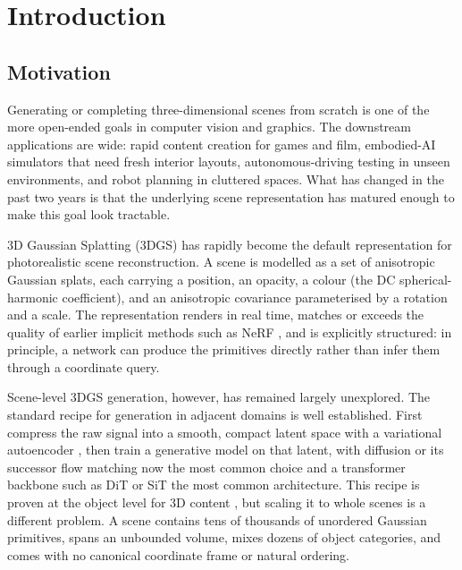 \chapter{Introduction}
\label{chap:intro}

\section{Motivation}
\label{sec:intro_motivation}

Generating or completing three-dimensional scenes from scratch is one of the more open-ended goals in computer vision and graphics. The downstream applications are wide: rapid content creation for games and film, embodied-AI simulators that need fresh interior layouts, autonomous-driving testing in unseen environments, and robot planning in cluttered spaces. What has changed in the past two years is that the underlying scene representation has matured enough to make this goal look tractable.

3D Gaussian Splatting (3DGS) \citep{kerbl2023gaussian} has rapidly become the default representation for photorealistic scene reconstruction. A scene is modelled as a set of anisotropic Gaussian splats, each carrying a position, an opacity, a colour (the DC spherical-harmonic coefficient), and an anisotropic covariance parameterised by a rotation and a scale. The representation renders in real time, matches or exceeds the quality of earlier implicit methods such as NeRF \citep{mildenhall2020nerf}, and is explicitly structured: in principle, a network can produce the primitives directly rather than infer them through a coordinate query.

Scene-level 3DGS generation, however, has remained largely unexplored. The standard recipe for generation in adjacent domains is well established. First compress the raw signal into a smooth, compact latent space with a variational autoencoder \citep{kingma2014vae}, then train a generative model on that latent, with diffusion \citep{ho2020ddpm} or its successor flow matching \citep{lipman2023flowmatching, liu2023rectified} now the most common choice and a transformer backbone such as DiT \citep{peebles2023dit} or SiT \citep{ma2024sit} the most common architecture. This recipe is proven at the object level for 3D content \citep{zeng2022lion, zhao2023michelangelo, zhang2024gaussiancube}, but scaling it to whole scenes is a different problem. A scene contains tens of thousands of unordered Gaussian primitives, spans an unbounded volume, mixes dozens of object categories, and comes with no canonical coordinate frame or natural ordering.

